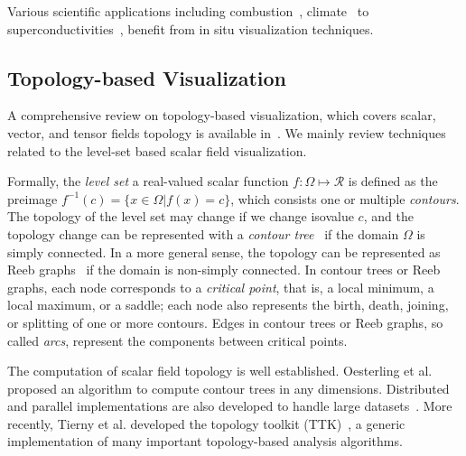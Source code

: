 Various scientific applications including combustion~\cite{YuWGCM10}, climate~\cite{WoodringPSPAH16} to superconductivities~\cite{GuoPG17}, benefit from in situ visualization techniques.  



\subsection{Topology-based Visualization}

A comprehensive review on topology-based visualization, which covers scalar, vector, and tensor fields topology is available in~\cite{HeineLHIFSHG16}.  We mainly review techniques related to the level-set based scalar field visualization.  

Formally, the \emph{level set} a real-valued scalar function $f: \Omega\mapsto\mathcal{R}$ is defined as the preimage $f^{-1}(c) = \{x\in\Omega | f(x) = c \}$, which consists one or multiple \emph{contours}.  The topology of the level set may change if we change isovalue $c$, and the topology change can be represented with a \emph{contour tree}~\cite{} if the domain $\Omega$ is simply connected.  In a more general sense, the topology can be represented as Reeb graphs~\cite{Reeb46} if the domain is non-simply connected.  In contour trees or Reeb graphs, each node corresponds to a \emph{critical point}, that is, a local minimum, a local maximum, or a saddle; each node also represents the birth, death, joining, or splitting of one or more contours.  Edges in contour trees or Reeb graphs, so called \emph{arcs}, represent the components between critical points. 

The computation of scalar field topology is well established.  Oesterling et al.~\cite{OesterlingHWMS17} proposed an algorithm to compute contour trees in any dimensions.  Distributed and parallel implementations are also developed to handle large datasets~\cite{MorozovW13}.  More recently, Tierny et al. developed the topology toolkit (TTK)~\cite{TiernyFLGM18}, a generic implementation of many important topology-based analysis algorithms.  

